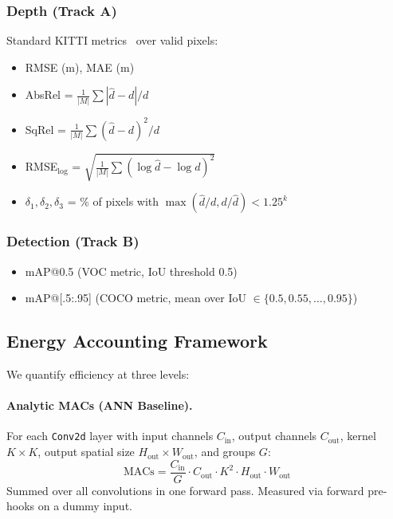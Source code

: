 \documentclass[10pt,conference]{IEEEtran}
\begin{document}
\subsubsection{Depth (Track A)}
Standard KITTI metrics~\cite{geiger2012we} over valid pixels:
\begin{itemize}
    \item RMSE (m), MAE (m)
    \item AbsRel = $\frac{1}{|M|}\sum |\hat{d}-d|/d$
    \item SqRel = $\frac{1}{|M|}\sum (\hat{d}-d)^2/d$
    \item RMSE$_{\log}$ = $\sqrt{\frac{1}{|M|}\sum (\log\hat{d}-\log d)^2}$
    \item $\delta_1, \delta_2, \delta_3$ = $\%$ of pixels with $\max(\hat{d}/d, d/\hat{d}) < 1.25^k$
\end{itemize}

\subsubsection{Detection (Track B)}
\begin{itemize}
    \item mAP@0.5 (VOC metric, IoU threshold 0.5)
    \item mAP@[.5:.95] (COCO metric, mean over IoU $\in \{0.5, 0.55, \dots, 0.95\}$)
\end{itemize}

\subsection{Energy Accounting Framework}
\label{sec:energy_accounting}

We quantify efficiency at three levels:

\paragraph{Analytic MACs (ANN Baseline).} For each \texttt{Conv2d} layer with input channels $C_{\text{in}}$, output channels $C_{\text{out}}$, kernel $K \times K$, output spatial size $H_{\text{out}} \times W_{\text{out}}$, and groups $G$:
\begin{equation}
    \text{MACs} = \frac{C_{\text{in}}}{G} \cdot C_{\text{out}} \cdot K^2 \cdot H_{\text{out}} \cdot W_{\text{out}}
\end{equation}
Summed over all convolutions in one forward pass. Measured via forward pre-hooks on a dummy input.
\end{document}
